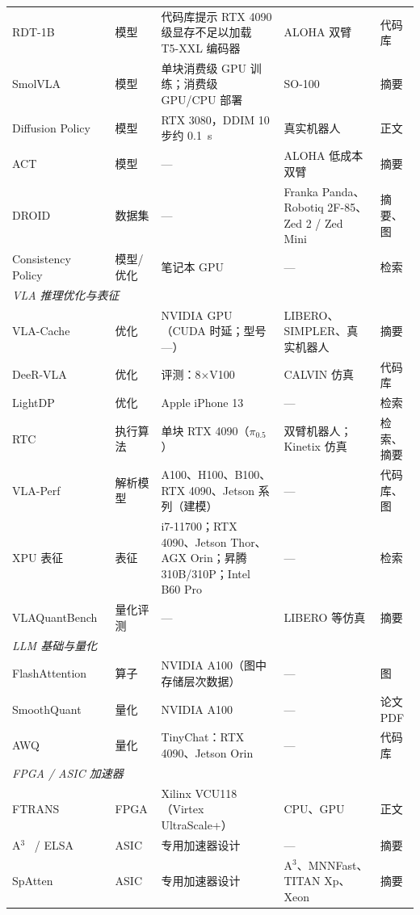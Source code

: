 \documentclass[a4paper,10.5pt]{ctexart}
\newcommand{\pihalf}{$\pi_{0.5}$}
\begin{document}
\begin{small}
\begin{longtable}{p{2.2cm} p{1.5cm} p{4.6cm} p{3.6cm} p{1.9cm}}
RDT-1B~\cite{rdt} & 模型 & 代码库提示 RTX 4090 级显存不足以加载 T5-XXL 编码器 & ALOHA 双臂 & 代码库 \\
SmolVLA~\cite{smolvla} & 模型 & 单块消费级 GPU 训练；消费级 GPU/CPU 部署 & SO-100 & 摘要 \\
Diffusion Policy~\cite{diffpolicy} & 模型 & RTX 3080，DDIM 10 步约 0.1~s & 真实机器人 & 正文 \\
ACT~\cite{act} & 模型 & — & ALOHA 低成本双臂 & 摘要 \\
DROID~\cite{droid} & 数据集 & — & Franka Panda、Robotiq 2F-85、Zed 2 / Zed Mini & 摘要、图 \\
Consistency Policy~\cite{consistencypolicy} & 模型/优化 & 笔记本 GPU & — & 检索 \\
\multicolumn{5}{l}{\textit{VLA 推理优化与表征}} \\
VLA-Cache~\cite{vlacache} & 优化 & NVIDIA GPU（CUDA 时延；型号—） & LIBERO、SIMPLER、真实机器人 & 摘要 \\
DeeR-VLA~\cite{deervla} & 优化 & 评测：8$\times$V100 & CALVIN 仿真 & 代码库 \\
LightDP~\cite{lightdp} & 优化 & Apple iPhone 13 & — & 检索 \\
RTC~\cite{rtc} & 执行算法 & 单块 RTX 4090（\pihalf{}） & 双臂机器人；Kinetix 仿真 & 检索、摘要 \\
VLA-Perf~\cite{vlaperf} & 解析模型 & A100、H100、B100、RTX 4090、Jetson 系列（建模） & — & 代码库、图 \\
XPU 表征~\cite{xpuvla} & 表征 & i7-11700；RTX 4090、Jetson Thor、AGX Orin；昇腾 310B/310P；Intel B60 Pro & — & 检索 \\
VLAQuantBench~\cite{vlaquantbench} & 量化评测 & — & LIBERO 等仿真 & 摘要 \\
\multicolumn{5}{l}{\textit{LLM 基础与量化}} \\
FlashAttention~\cite{flashattn} & 算子 & NVIDIA A100（图中存储层次数据） & — & 图 \\
SmoothQuant~\cite{smoothquant} & 量化 & NVIDIA A100 & — & 论文 PDF \\
AWQ~\cite{awq} & 量化 & TinyChat：RTX 4090、Jetson Orin & — & 代码库 \\
\multicolumn{5}{l}{\textit{FPGA / ASIC 加速器}} \\
FTRANS~\cite{ftrans} & FPGA & Xilinx VCU118（Virtex UltraScale+） & CPU、GPU & 正文 \\
A$^3$~\cite{a3} / ELSA~\cite{elsa} & ASIC & 专用加速器设计 & — & 摘要 \\
SpAtten~\cite{spatten} & ASIC & 专用加速器设计 & A$^3$、MNNFast、TITAN Xp、Xeon & 摘要 \\

\end{longtable}
\end{small}
\end{document}
